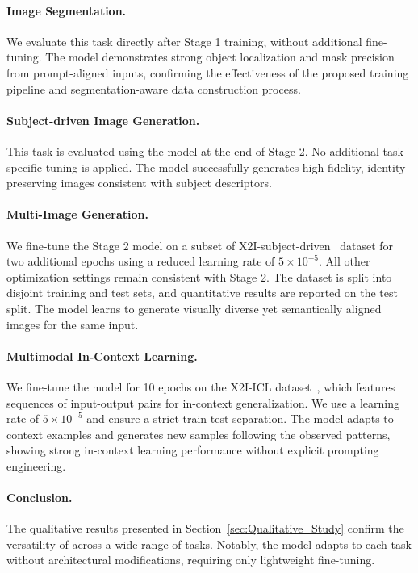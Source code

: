 \paragraph{Image Segmentation.}
We evaluate this task directly after Stage 1 training, without additional fine-tuning. The model demonstrates strong object localization and mask precision from prompt-aligned inputs, confirming the effectiveness of the proposed training pipeline and segmentation-aware data construction process.

\paragraph{Subject-driven Image Generation.}
This task is evaluated using the model at the end of Stage 2. No additional task-specific tuning is applied. The model successfully generates high-fidelity, identity-preserving images consistent with subject descriptors.

\paragraph{Multi-Image Generation.}
We fine-tune the Stage 2 model on a subset of X2I-subject-driven~\citep{OmniGen} dataset for two additional epochs using a reduced learning rate of $5 \times 10^{-5}$. All other optimization settings remain consistent with Stage 2. The dataset is split into disjoint training and test sets, and quantitative results are reported on the test split. The model learns to generate visually diverse yet semantically aligned images for the same input.

\paragraph{Multimodal In-Context Learning.}
We fine-tune the model for 10 epochs on the X2I-ICL dataset~\citep{OmniGen}, which features sequences of input-output pairs for in-context generalization. We use a learning rate of $5 \times 10^{-5}$ and ensure a strict train-test separation. The model adapts to context examples and generates new samples following the observed patterns, showing strong in-context learning performance without explicit prompting engineering.

\paragraph{Conclusion.}
The qualitative results presented in Section~\ref{sec:Qualitative_Study} confirm the versatility of \model across a wide range of tasks. Notably, the model adapts to each task without architectural modifications, requiring only lightweight fine-tuning.


